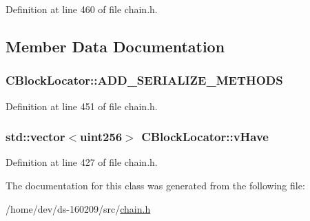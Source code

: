 Definition at line 460 of file chain.\+h.



\subsection{Member Data Documentation}
\hypertarget{class_c_block_locator_a543b8a4c763183dc9121caade061441f}{}
\subsubsection[{A\+D\+D\+\_\+\+S\+E\+R\+I\+A\+L\+I\+Z\+E\+\_\+\+M\+E\+T\+H\+O\+D\+S}]{\setlength{\rightskip}{0pt plus 5cm}C\+Block\+Locator\+::\+A\+D\+D\+\_\+\+S\+E\+R\+I\+A\+L\+I\+Z\+E\+\_\+\+M\+E\+T\+H\+O\+D\+S}\label{class_c_block_locator_a543b8a4c763183dc9121caade061441f}


Definition at line 451 of file chain.\+h.

\hypertarget{class_c_block_locator_a745204ecd8c9326b43ac54d7f780534f}{}
\subsubsection[{v\+Have}]{\setlength{\rightskip}{0pt plus 5cm}std\+::vector$<${\bf uint256}$>$ C\+Block\+Locator\+::v\+Have\hspace{0.3cm}{\ttfamily [protected]}}\label{class_c_block_locator_a745204ecd8c9326b43ac54d7f780534f}


Definition at line 427 of file chain.\+h.



The documentation for this class was generated from the following file\+:\begin{DoxyCompactItemize}
\item 
/home/dev/ds-\/160209/src/\hyperlink{chain_8h}{chain.\+h}\end{DoxyCompactItemize}
